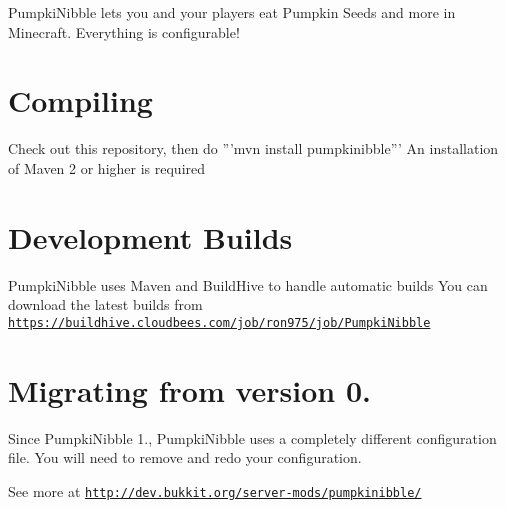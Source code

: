 Pumpki\-Nibble lets you and your players eat Pumpkin Seeds and more in Minecraft. Everything is configurable!

\section*{Compiling}

Check out this repository, then do '''mvn install pumpkinibble''' An installation of Maven 2 or higher is required

\section*{Development Builds}

Pumpki\-Nibble uses Maven and Build\-Hive to handle automatic builds You can download the latest builds from \href{https://buildhive.cloudbees.com/job/ron975/job/PumpkiNibble}{\tt https\-://buildhive.\-cloudbees.\-com/job/ron975/job/\-Pumpki\-Nibble}

\section*{Migrating from version 0.}

Since Pumpki\-Nibble 1., Pumpki\-Nibble uses a completely different configuration file. You will need to remove and redo your configuration.

See more at \href{http://dev.bukkit.org/server-mods/pumpkinibble/}{\tt http\-://dev.\-bukkit.\-org/server-\/mods/pumpkinibble/} 